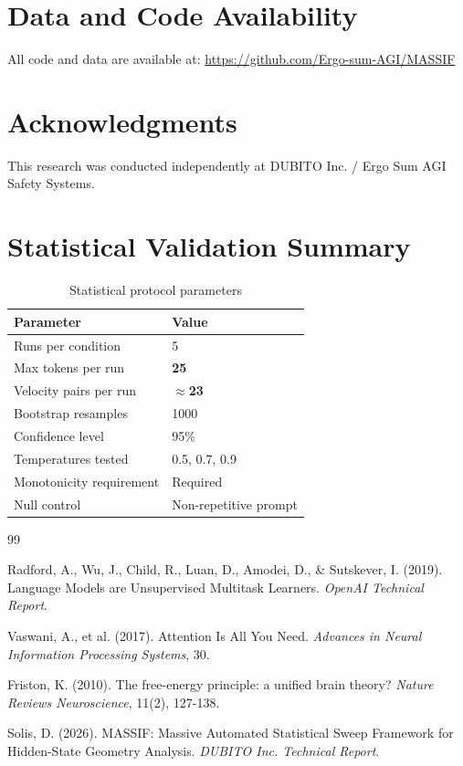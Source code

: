 \documentclass[12pt,a4paper]{article}
\begin{document}
\section{Data and Code Availability}

All code and data are available at:
\url{https://github.com/Ergo-sum-AGI/MASSIF}

\section*{Acknowledgments}

This research was conducted independently at DUBITO Inc. / Ergo Sum AGI Safety Systems.

\section*{Statistical Validation Summary}

\begin{table}[H]
\centering
\caption{Statistical protocol parameters}
\begin{tabular}{ll}
\toprule
\textbf{Parameter} & \textbf{Value} \\
\midrule
Runs per condition & 5 \\
Max tokens per run & \textbf{25} \\
Velocity pairs per run & $\approx$\textbf{23} \\
Bootstrap resamples & 1000 \\
Confidence level & 95\% \\
Temperatures tested & 0.5, 0.7, 0.9 \\
Monotonicity requirement & Required \\
Null control & Non-repetitive prompt \\
\bottomrule
\end{tabular}
\end{table}


\begin{thebibliography}{99}

Radford, A., Wu, J., Child, R., Luan, D., Amodei, D., \& Sutskever, I. (2019).
Language Models are Unsupervised Multitask Learners.
\textit{OpenAI Technical Report}.

Vaswani, A., et al. (2017).
Attention Is All You Need.
\textit{Advances in Neural Information Processing Systems}, 30.

Friston, K. (2010).
The free-energy principle: a unified brain theory?
\textit{Nature Reviews Neuroscience}, 11(2), 127-138.

Solis, D. (2026).
MASSIF: Massive Automated Statistical Sweep Framework for Hidden-State Geometry Analysis.
\textit{DUBITO Inc. Technical Report}.

\end{thebibliography}
\end{document}
